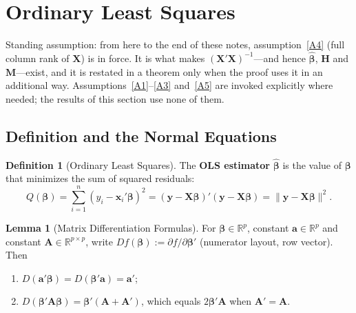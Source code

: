 \documentclass[12pt,a4paper]{article}
\theoremstyle{definition}
\newtheorem{definition}[theorem]{Definition}
\newtheorem{lemma}[theorem]{Lemma}
\newcommand{\bX}{\mathbf{X}}
\newcommand{\by}{\mathbf{y}}
\newcommand{\bx}{\mathbf{x}}
\def\bb{\boldsymbol{\beta}}
\newcommand{\bH}{\mathbf{H}}
\newcommand{\bM}{\mathbf{M}}
\newcommand{\bA}{\mathbf{A}}
\newcommand{\ba}{\mathbf{a}}
\newcommand{\Real}{\mathbb{R}}
\begin{document}
\section{Ordinary Least Squares}\label{sec:ols}

Standing assumption: from here to the end of these notes, assumption~\ref{A4} (full column rank of $\bX$) is in force. It is what makes $(\bX'\bX)^{-1}$---and hence $\hat{\bb}$, $\bH$ and $\bM$---exist, and it is restated in a theorem only when the proof uses it in an additional way. Assumptions~\ref{A1}--\ref{A3} and~\ref{A5} are invoked explicitly where needed; the results of this section use none of them.

\subsection{Definition and the Normal Equations}

\begin{definition}[Ordinary Least Squares]\label{def:ols}
The \textbf{OLS estimator} $\hat{\bb}$ is the value of $\bb$ that minimizes the sum of squared residuals:
\begin{equation}
Q(\bb) = \sum_{i=1}^{n}(y_i - \bx_i'\bb)^2 = (\by - \bX\bb)'(\by - \bX\bb) = \|\by - \bX\bb\|^2.
\end{equation}
\end{definition}

\begin{lemma}[Matrix Differentiation Formulas]\label{lem:matrix-diff}
For $\bb \in \Real^p$, constant $\ba \in \Real^p$ and constant $\bA \in \Real^{p\times p}$, write $Df(\bb) := \partial f/\partial\bb'$ (numerator layout, row vector). Then
\begin{enumerate}[label=\textup{(\roman*)}]
\item $D(\ba'\bb) = D(\bb'\ba) = \ba'$;
\item $D(\bb'\bA\bb) = \bb'(\bA + \bA')$, which equals $2\bb'\bA$ when $\bA' = \bA$.
\end{enumerate}
\end{lemma}
\end{document}
